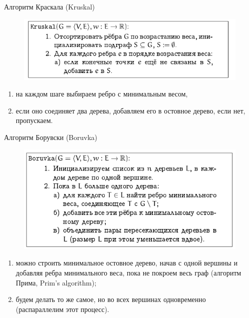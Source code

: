 \documentclass{beamer}
\begin{document}
\begin{frame}{Алгоритм Краскала (Kruskal)}
\begin{figure}[h]
\centering
\includegraphics[scale=0.65]{images/lec07-pic20.png}
\end{figure}
\begin{enumerate}
\item на каждом шаге выбираем ребро с минимальным весом, 
\item если оно соединяет два дерева, добавляем его в остовное дерево, если нет, пропускаем. 
\end{enumerate}
\end{frame}

\begin{frame}{Алгоритм Борувски (Boruvka)}
\begin{figure}[h]
\centering
\includegraphics[scale=0.6]{images/lec07-pic21.png}
\end{figure}
\begin{enumerate}
\item можно строить минимальное остовное дерево, начав с одной вершины и добавляя ребра минимального
веса, пока не покроем весь граф (алгоритм Прима, Prim's algorithm);
\item будем делать то же самое, но во всех вершинах одновременно (распараллелим этот процесс).
\end{enumerate}
\end{frame}
\end{document}
